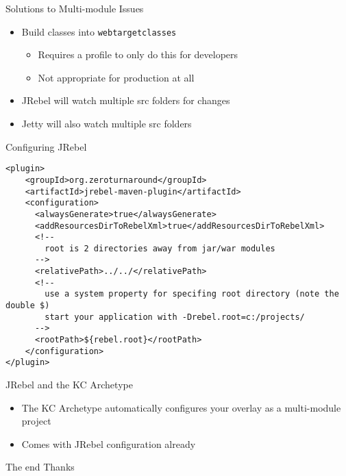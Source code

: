\documentclass[xcolor=dvipsnames,14pt]{beamer}
\begin{document}
\begin{frame}{Solutions to Multi-module Issues}
  \begin{itemize}
    \item Build classes into \texttt{web\/target\/classes}
      \begin{itemize}
        \item Requires a profile to only do this for developers
        \item Not appropriate for production at all
      \end{itemize}
    \item JRebel will watch multiple src folders for changes
    \item Jetty will also watch multiple src folders
  \end{itemize}
\end{frame}

\begin{frame}[fragile]{Configuring JRebel}
  \begin{verbatim}
<plugin>
    <groupId>org.zeroturnaround</groupId>
    <artifactId>jrebel-maven-plugin</artifactId>
    <configuration>
      <alwaysGenerate>true</alwaysGenerate>
      <addResourcesDirToRebelXml>true</addResourcesDirToRebelXml>
      <!--
        root is 2 directories away from jar/war modules
      -->
      <relativePath>../../</relativePath>
      <!--
        use a system property for specifing root directory (note the double $)
        start your application with -Drebel.root=c:/projects/
      -->
      <rootPath>${rebel.root}</rootPath>
    </configuration>
</plugin>
    \end{verbatim}
\end{frame}

\begin{frame}{JRebel and the KC Archetype}
\begin{itemize}
  \item The KC Archetype automatically configures your overlay as a multi-module project
  \item Comes with JRebel configuration already
\end{itemize}
\end{frame}

\begin{frame}{The end}
Thanks
\end{frame}
\end{document}
